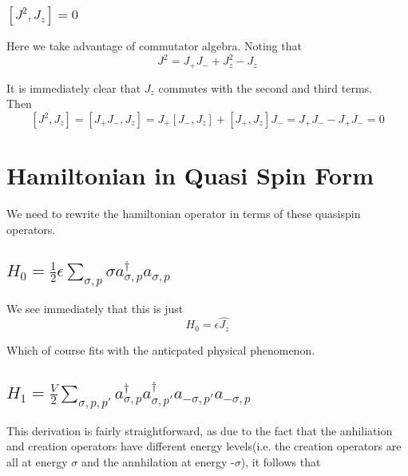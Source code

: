 \documentclass[11pt]{article} %
\begin{document}
\subsubsection{$\left[J^2,J_z\right]=0$}

Here we take advantage of commutator algebra. Noting that\\

\begin{equation}
J^2=J_+J_-+J_z^2-J_z
\end{equation}

It is immediately clear that $J_z$ commutes with the second and third terms.\\

Then\\

\begin{equation}
\left[J^2,J_z\right]=\left[J_+J_-,J_z \right]=J_+\left[J_-,J_z\right]+\left[J_+,J_z\right]J_-=J_+J_- -J_+J_-=0
\end{equation}


\section{Hamiltonian in Quasi Spin Form}

We need to rewrite the hamiltonian operator in terms of these quasispin operators. 

\subsection{$H_0=\frac{1}{2}\epsilon \sum_{\sigma,p} \sigma a_{\sigma,p}^\dagger  a_{\sigma,p}$}

We see immediately that this is just\\

\begin{equation}
H_0=\epsilon \hat{J_z}
\end{equation}

Which of course fits with the anticpated physical phenomenon.

\subsection{$H_1=\frac{V}{2}\sum_{\sigma,p,p'} a_{\sigma,p}^\dagger a_{\sigma,p'}^\dagger a_{-\sigma,p'}a_{-\sigma,p}$}

This derivation is fairly straightforward, as due to the fact that the anhiliation and creation operators have different energy levels(i.e. the creation operators are all at energy $\sigma$ and the annhilation at energy -$\sigma$), it follows that\\
\end{document}

